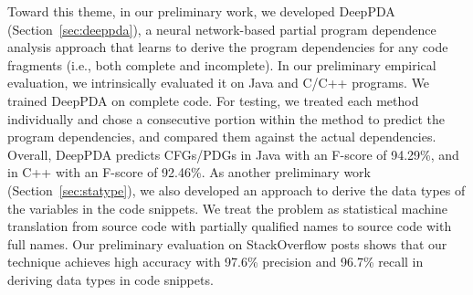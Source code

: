 

Toward this theme, in our preliminary work, we developed DeepPDA
(Section~\ref{sec:deeppda}), a neural network-based partial program
dependence analysis approach that learns to derive the program
dependencies for any code fragments (i.e., both complete and
incomplete). In our preliminary empirical evaluation, we intrinsically
evaluated it on Java and C/C++ programs. We trained DeepPDA on
complete code. For testing, we treated each method individually and
chose a consecutive portion within the method to predict the program
dependencies, and compared them against the actual
dependencies. Overall, DeepPDA predicts CFGs/PDGs in Java with
an F-score of 94.29\%, and in C++ with an F-score of 92.46\%. As
another preliminary work (Section~\ref{sec:statype}), we also
developed an approach to derive the data types of the variables in the
code snippets. We treat the problem as statistical machine translation
from source code with partially qualified names to source code with
full names. Our preliminary evaluation on StackOverflow posts shows
that our technique achieves high accuracy with 97.6\% precision and
96.7\% recall in deriving data types in code snippets.
